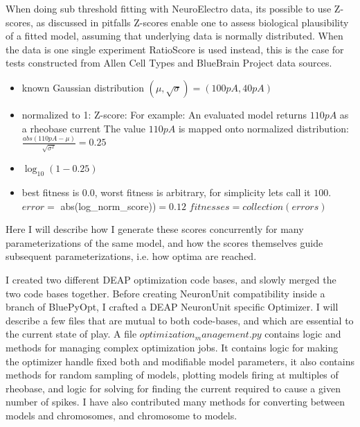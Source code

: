 When doing sub threshold fitting with NeuroElectro data, its possible to use Z-scores, as discussed in pitfalls Z-scores enable one to assess biological plausibility of a fitted model, assuming that underlying data is normally distributed.  When the data is one single experiment RatioScore is used instead, this is the case for tests constructed from Allen Cell Types and BlueBrain Project data sources.

\begin{itemize}
    \item known Gaussian distribution $(\mu, \sqrt{\sigma}) = (100pA, 40pA)$
    \item normalized to 1: Z-score: 
        \subitem For example: An evaluated model returns $110pA$ as a rheobase current
        \subitem The value $110pA$ is mapped onto normalized distribution: $\frac{abs(110pA-\mu)}{\sqrt{\sigma^{2}}} = 0.25$
    \item $\log_{10}(1-0.25) $ 
    \item best fitness is $0.0$, worst fitness is arbitrary, for simplicity lets call it $100$.
        \subitem  $ error = $ abs(log_norm_score))$ = 0.12$ 
        \subitem $ fitnesses = collection(errors) $
\end{itemize}

Here I will describe how I generate these scores concurrently for many parameterizations of the same model, and how the scores themselves guide subsequent parameterizations, i.e. how optima are reached.

I created two different DEAP optimization code bases, and slowly merged the two code bases together. Before creating NeuronUnit compatibility inside a branch of BluePyOpt, I crafted a DEAP NeuronUnit specific Optimizer. I will describe a few files that are mutual to both code-bases, and which are essential to the current state of play. A file $optimization_management.py$ contains logic and methods for managing complex optimization jobs. It contains logic for making the optimizer handle fixed both and modifiable model parameters, it also contains methods for random sampling of models, plotting models firing at multiples of rheobase, and logic for solving for finding the current required to cause a given number of spikes. I have also contributed many methods for converting between models and chromosomes, and chromosome to models.

